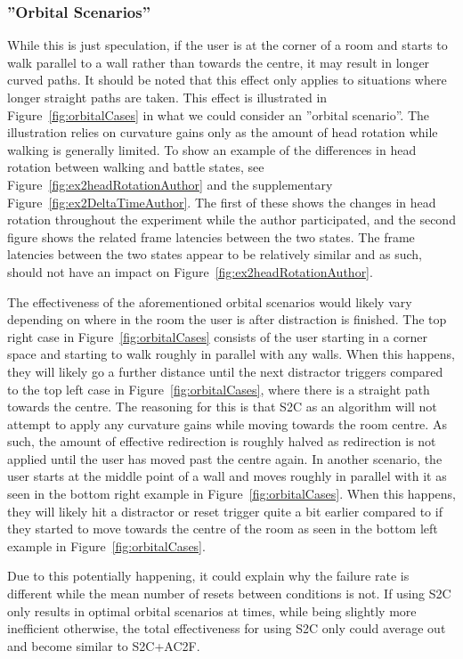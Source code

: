 \subsubsection{''Orbital Scenarios''}
While this is just speculation, if the user is at the corner of a room and starts to walk parallel to a wall rather than towards the centre, it may result in longer curved paths. It should be noted that this effect only applies to situations where longer straight paths are taken. This effect is illustrated in Figure~\ref{fig:orbitalCases} in what we could consider an ''orbital scenario''. The illustration relies on curvature gains only as the amount of head rotation while walking is generally limited. To show an example of the differences in head rotation between walking and battle states, see Figure~\ref{fig:ex2headRotationAuthor} and the supplementary Figure~\ref{fig:ex2DeltaTimeAuthor}. The first of these shows the changes in head rotation throughout the experiment while the author participated, and the second figure shows the related frame latencies between the two states. The frame latencies between the two states appear to be relatively similar and as such, should not have an impact on Figure~\ref{fig:ex2headRotationAuthor}.

The effectiveness of the aforementioned orbital scenarios would likely vary depending on where in the room the user is after distraction is finished. The top right case in Figure~\ref{fig:orbitalCases} consists of the user starting in a corner space and starting to walk roughly in parallel with any walls. When this happens, they will likely go a further distance until the next distractor triggers compared to the top left case in Figure~\ref{fig:orbitalCases}, where there is a straight path towards the centre. The reasoning for this is that S2C as an algorithm will not attempt to apply any curvature gains while moving towards the room centre. As such, the amount of effective redirection is roughly halved as redirection is not applied until the user has moved past the centre again. In another scenario, the user starts at the middle point of a wall and moves roughly in parallel with it as seen in the bottom right example in Figure~\ref{fig:orbitalCases}. When this happens, they will likely hit a distractor or reset trigger quite a bit earlier compared to if they started to move towards the centre of the room as seen in the bottom left example in Figure~\ref{fig:orbitalCases}.  

Due to this potentially happening, it could explain why the failure rate is different while the mean number of resets between conditions is not. If using S2C only results in optimal orbital scenarios at times, while being slightly more inefficient otherwise, the total effectiveness for using S2C only could average out and become similar to S2C+AC2F. 

